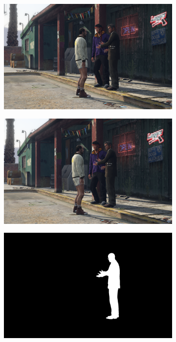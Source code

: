 \begin{figure}
\centering
\begin{subfigure}[t]{0.19\textwidth}
\centering
\includegraphics[scale=0.07]{good_examples/visual_81815_img.png}
\end{subfigure}
\begin{subfigure}[t]{0.19\textwidth}
\centering
\includegraphics[scale=0.07]{good_examples/visual_81815_img1.png}
\end{subfigure}
\begin{subfigure}[t]{0.19\textwidth}
\centering
\includegraphics[scale=0.07]{good_examples/visual_81815_gt.png}

\end{subfigure}
\end{figure}
